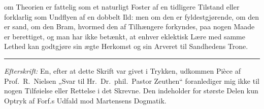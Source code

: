 om Theorien er fattelig som et naturligt Foster af en tidligere
Tilstand eller forklarlig som Undflyen af en dobbelt Ild: men om den er
fyldestgjørende, om den er sand, om den Bram, hvormed den af Tilhængere
forkyndes, paa nogen Maade er berettiget, og man har ikke betænkt, at enhver
eklektisk Lære med samme Lethed kan godtgjøre sin ægte Herkomst og sin
Arveret til Sandhedens Trone.

\begin{center}
\rule{0.16\textwidth}{0.4pt}
\end{center}

\emph{Efterskrift:} En, efter at dette Skrift var givet i Trykken, udkommen
Pièce af Prof.\ R.\ Nielsen „Svar til Hr.\ Dr.\ phil.\ Pastor Zeuthen“
foranlediger mig ikke til nogen Tilføielse eller Rettelse i det Skrevne. Den
indeholder for største Delen kun Optryk af Forf.s Udfald mod Martensens
Dogmatik.


